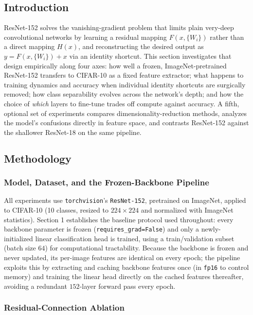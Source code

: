 \subsection{Introduction}

ResNet-152 solves the vanishing-gradient problem that limits plain very-deep
convolutional networks by learning a residual mapping
$F(x,\{W_i\})$ rather than a direct mapping $H(x)$, and reconstructing the
desired output as $y = F(x,\{W_i\}) + x$ via an identity shortcut. This
section investigates that design empirically along four axes: how well a
frozen, ImageNet-pretrained ResNet-152 transfers to CIFAR-10 as a fixed
feature extractor; what happens to training dynamics and accuracy when
individual identity shortcuts are surgically removed; how class separability
evolves across the network's depth; and how the choice of \emph{which}
layers to fine-tune trades off compute against accuracy. A fifth, optional
set of experiments compares dimensionality-reduction methods, analyzes the
model's confusions directly in feature space, and contrasts ResNet-152
against the shallower ResNet-18 on the same pipeline.

\subsection{Methodology}

\subsubsection{Model, Dataset, and the Frozen-Backbone Pipeline}

All experiments use \texttt{torchvision}'s \texttt{ResNet-152}, pretrained
on ImageNet, applied to CIFAR-10 (10 classes, resized to $224\times224$ and
normalized with ImageNet statistics). Section 1 establishes the baseline
protocol used throughout: every backbone parameter is frozen
(\texttt{requires\_\allowbreak grad\allowbreak=\allowbreak False}) and only a newly-initialized linear
classification head is trained, using a train/validation subset (batch size
$64$) for computational tractability. Because the backbone is frozen and
never updated, its per-image features are identical on every epoch; the
pipeline exploits this by extracting and caching backbone features once
(in \texttt{fp16} to control memory) and training the linear head directly
on the cached features thereafter, avoiding a redundant $152$-layer forward
pass every epoch.

\subsubsection{Residual-Connection Ablation}

